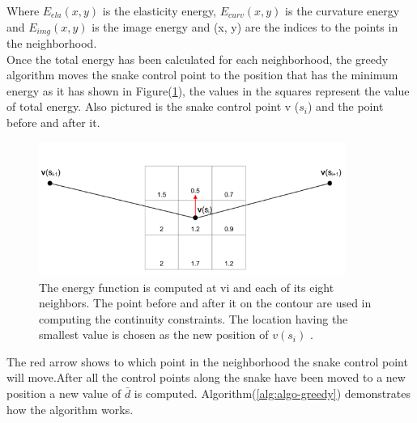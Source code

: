 \hspace{-0.6cm}Where $E_{ela}(x,y)$ is the elasticity energy, $E_{curv}(x,y)$ is the curvature energy and
$E_{img}(x,y)$ is the image energy and (x, y) are the indices to the points in the neighborhood.\\
Once the total energy has been calculated for each neighborhood, the greedy
algorithm moves the snake control point to the position that has the minimum
energy as it has shown in Figure(\ref{fig:figure3}), the values in the squares represent the
value of total energy. Also pictured is the snake control point v ($s_i$) and the
point before and after it.
\vspace{2cm}
\begin{figure}[ht]
        \centering
        \includegraphics[width=10cm]{chapiter2/figures/Figure 3 The energy function is computed at vi and each of its eight.png}
        \caption{The energy function is computed at vi and each of its eight
        neighbors. The point before and after it on the contour are used in
        computing the continuity constraints. The location having the smallest
        value is chosen as the new position of $v(s_i)$ \cite{2.7}.}
        \label{fig:figure3}
\end{figure}

\hspace{-0.6cm}The red arrow shows to which point in the neighborhood the snake control
point will move.After all the control points along the snake have been moved
to a new position a new value of $\bar{d}$ is computed.
Algorithm(\ref{alg:algo-greedy}) demonstrates how the algorithm works.


